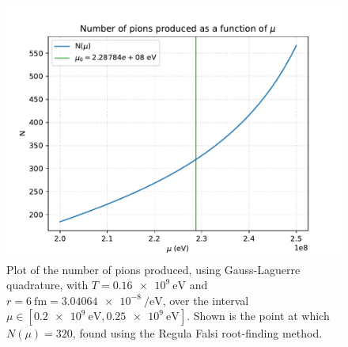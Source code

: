 \documentclass[11pt]{article}
\begin{document}
\begin{enumerate}
    \begin{figure}[h]
        \begin{center}
            \includegraphics[width=.6\textwidth]{Plots/q3b.pdf}
            \caption{Plot of the number of pions produced, using Gauss-Laguerre quadrature, with $T=\SI{0.16e9}{\electronvolt}$ and $r=\SI{6}{\femto\metre}=\SI{3.04064e-8}{\per\electronvolt}$, over the interval $\mu\in [\SI{0.2e9}{\electronvolt},\SI{0.25e9}{\electronvolt}]$. Shown is the point at which $N(\mu)=320$, found using the Regula Falsi root-finding method.}
            \label{fig:q3b}
        \end{center}
    \end{figure}
    
    

\end{enumerate}
\end{document}
